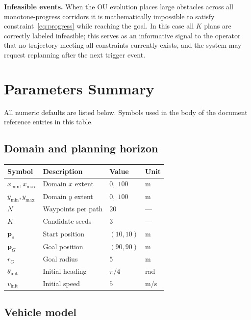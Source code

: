 \documentclass[11pt,a4paper]{article}
\begin{document}
\textbf{Infeasible events.}
When the OU evolution places large obstacles across all monotone-progress
corridors it is mathematically impossible to satisfy
constraint~\eqref{eq:progress} while reaching the goal.
In this case all $K$ plans are correctly labeled infeasible; this serves as an
informative signal to the operator that no trajectory meeting all constraints
currently exists, and the system may request replanning after the next trigger
event.

\section{Parameters Summary}
\label{sec:params}

All numeric defaults are listed below.  Symbols used in the body of the
document reference entries in this table.

\subsection*{Domain and planning horizon}

\begin{center}
\begin{tabular}{llll}
\toprule
Symbol & Description & Value & Unit \\
\midrule
$x_{\min}, x_{\max}$ & Domain $x$ extent    & $0,\;100$ & m \\
$y_{\min}, y_{\max}$ & Domain $y$ extent    & $0,\;100$ & m \\
$N$                  & Waypoints per path   & $20$      & --- \\
$K$                  & Candidate seeds      & $3$       & --- \\
$\mathbf{p}_s$       & Start position       & $(10,10)$ & m \\
$\mathbf{p}_G$       & Goal position        & $(90,90)$ & m \\
$r_G$                & Goal radius          & $5$       & m \\
$\theta_{\mathrm{init}}$ & Initial heading  & $\pi/4$   & rad \\
$v_{\mathrm{init}}$  & Initial speed        & $5$       & m/s \\
\bottomrule
\end{tabular}
\end{center}

\subsection*{Vehicle model}
\end{document}
